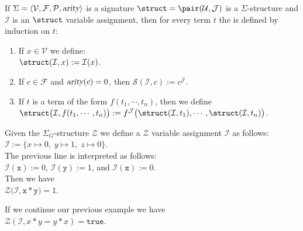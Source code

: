 \begin{Definition}
  If $\Sigma = \langle \mathcal{V}, \mathcal{F}, \mathcal{P}, \textsl{arity} \rangle$ is a signature
  $\struct = \pair(\mathcal{U},\mathcal{J})$ is a  $\Sigma$-structure and $\mathcal{I}$ is an  $\struct$
    variable assignment, then for every term $t$ the  
     is defined by induction on $t$:
    \begin{enumerate}
    \item If $x \in \mathcal{V}$ we define: \\[0.2cm]
          \hspace*{1.3cm} $\struct(\mathcal{I}, x) := \mathcal{I}(x)$.
    \item If $c \in \mathcal{F}$ and $\textsl{arity}(c) = 0$, then $\mathcal{S}(\mathcal{I}, c) := c^\mathcal{J}$.
    \item If $t$ is a term of the form $f(t_1,\cdots,t_n)$, then we define \\[0.2cm]
          \hspace*{1.3cm} $\struct\bigl(\mathcal{I}, f(t_1,\cdots,t_n)\bigr) := 
                           f^\mathcal{J}\bigl( \struct(\mathcal{I}, t_1), \cdots, \struct(\mathcal{I}, t_n) \bigr)$.
                           \eox
    \end{enumerate}
\end{Definition}

\exampleEng
Given the $\Sigma_G$-structure
$\mathcal{Z}$ we define a $\mathcal{Z}$ variable assignment $\mathcal{I}$ as follows:
\\[0.2cm]
\hspace*{1.3cm} $\mathcal{I} := \bigl\{ x \mapsto 0,\; y \mapsto 1,\; z \mapsto 0\bigr\}$.
\\[0.2cm]
The previous line is interpreted as follows:
\\[0.2cm]
\hspace*{1.3cm} $\mathcal{I}(\mathtt{x}) := 0$, \quad $\mathcal{I}(\mathtt{y}) := 1$, \quad and \quad $\mathcal{I}(\mathtt{z}) := 0$.
\\[0.2cm]
Then we have  \\[0.2cm]
\hspace*{1.3cm}  $\mathcal{Z}\bigl(\mathcal{I}, \mathtt{x} * \mathtt{y} \bigr) = 1$. \eox



\exampleEng
If we continue our previous example we have
\\[0.2cm]
\hspace*{1.3cm} 
$\mathcal{Z}(\mathcal{I},x * y = y * x) = \mathtt{true}$.
\eox

